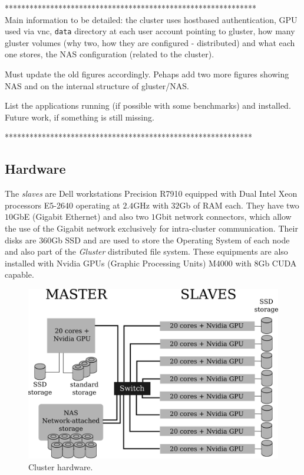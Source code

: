 \documentclass[twoside,a4paper,12pt,english]{inac19}
\begin{document}
*************************************************************\\
Main information to be detailed: the cluster uses hostbased authentication, GPU used via 
vnc, \texttt{data} directory at each user account pointing to gluster, how many gluster 
volumes (why two, how they are configured - distributed) and what each one stores, 
the NAS configuration (related to the cluster).

Must update the old figures accordingly. Pehaps add two more figures showing NAS 
and on the internal structure of gluster/NAS.

List the applications running (if possible with some benchmarks) and installed. 
Future work, if something is still missing.

************************************************************\\

\subsection{Hardware}

The \textit{slaves} are Dell workstations Precision R7910 equipped
with Dual Intel{\textregistered} Xeon{\textregistered} processors E5-2640 operating at $2.4$GHz with
$32$Gb of RAM each. They have two $10$GbE (Gigabit Ethernet) and also two $1$Gbit network connectors, which
allow the use of the Gigabit network exclusively for intra-cluster communication. Their disks are $360$Gb SSD
and are used to store the Operating System of each node and also part of the \textit{Gluster} distributed
file system. These equipments are also installed with Nvidia{\textregistered} GPUs (Graphic Processing Units) M4000{\textregistered} with $8$Gb CUDA\cite{CUDA} capable.

\begin{figure}[h] %
  \centering\includegraphics[scale=0.7]{images/cluster-topologico.png}
  \caption{Cluster hardware.}
  \label{fig:cluster}
\end{figure}
\end{document}
